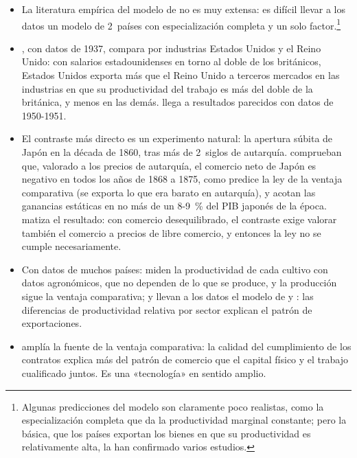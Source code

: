 \documentclass[11pt]{article}
\begin{document}
\begin{itemize}
\item La literatura empírica del modelo de  no es muy extensa: es difícil llevar a los datos un modelo de 2~países con especialización completa y un solo factor.\footnote{Algunas predicciones del modelo son claramente poco realistas, como la especialización completa que da la productividad marginal constante; pero la básica, que los países exportan los bienes en que su productividad es relativamente alta, la han confirmado varios estudios.}
\item \textcite{MacDougall1951British}, con datos de 1937, compara por industrias Estados Unidos y el Reino Unido: con salarios estadounidenses en torno al doble de los británicos, Estados Unidos exporta más que el Reino Unido a terceros mercados en las industrias en que su productividad del trabajo es más del doble de la británica, y menos en las demás. \textcite{Balassa1963Empirical} llega a resultados parecidos con datos de 1950-1951.
\item El contraste más directo es un experimento natural: la apertura súbita de Japón en la década de 1860, tras más de 2~siglos de autarquía. \textcite{BernhofenBrown2004Direct} comprueban que, valorado a los precios de autarquía, el comercio neto de Japón es negativo en todos los años de 1868 a 1875, como predice la ley de la ventaja comparativa (se exporta lo que era barato en autarquía), y \textcite{BernhofenBrown2005Empirical} acotan las ganancias estáticas en no más de un 8-9~\% del PIB japonés de la época. \textcite{Kiyota2007Testing,Kiyota2011Test} matiza el resultado: con comercio desequilibrado, el contraste exige valorar también el comercio a precios de libre comercio, y entonces la ley no se cumple necesariamente.
\item Con datos de muchos países: \textcite{CostinotDonaldson2012Ricardo} miden la productividad de cada cultivo con datos agronómicos, que no dependen de lo que se produce, y la producción sigue la ventaja comparativa; y \textcite{CostinotDonaldsonKomunjer2012What} llevan a los datos el modelo de  y : las diferencias de productividad relativa por sector explican el patrón de exportaciones.
\item \textcite{Nunn2007Relationship} amplía la fuente de la ventaja comparativa: la calidad del cumplimiento de los contratos explica más del patrón de comercio que el capital físico y el trabajo cualificado juntos. Es una «tecnología» en sentido amplio.
\end{itemize}
\end{document}
